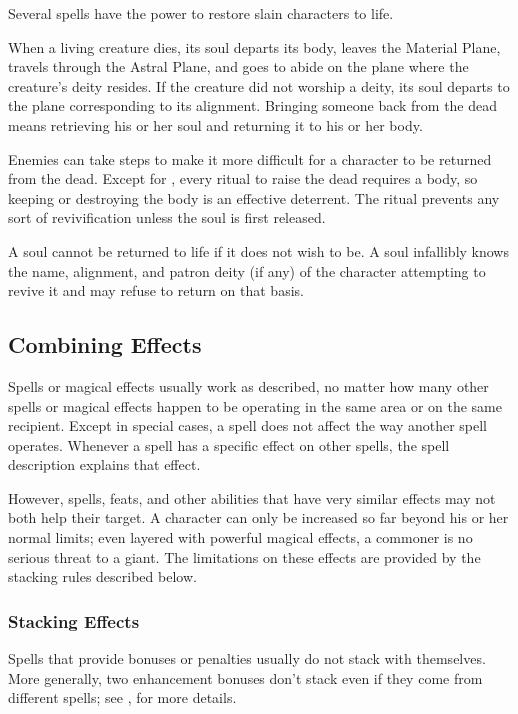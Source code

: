             Several spells have the power to restore slain characters to life.

            When a living creature dies, its soul departs its body, leaves the Material Plane, travels through the Astral Plane, and goes to abide on the plane where the creature's deity resides.
            If the creature did not worship a deity, its soul departs to the plane corresponding to its alignment.
            Bringing someone back from the dead means retrieving his or her soul and returning it to his or her body.

             Enemies can take steps to make it more difficult for a character to be returned from the dead.
            Except for , every ritual to raise the dead requires a body, so keeping or destroying the body is an effective deterrent.
            The  ritual prevents any sort of revivification unless the soul is first released.

             A soul cannot be returned to life if it does not wish to be.
            A soul infallibly knows the name, alignment, and patron deity (if any) of the character attempting to revive it and may refuse to return on that basis.

    \subsection{Combining Effects}
        Spells or magical effects usually work as described, no matter how many other spells or magical effects happen to be operating in the same area or on the same recipient.
        Except in special cases, a spell does not affect the way another spell operates.
        Whenever a spell has a specific effect on other spells, the spell description explains that effect.

        However, spells, feats, and other abilities that have very similar effects may not both help their target.
        A character can only be increased so far beyond his or her normal limits; even layered with powerful magical effects, a commoner is no serious threat to a giant.
        The limitations on these effects are provided by the stacking rules described below.

        \subsubsection{Stacking Effects}
            Spells that provide bonuses or penalties usually do not stack with themselves.
            More generally, two enhancement bonuses don't stack even if they come from different spells; see , for more details.

